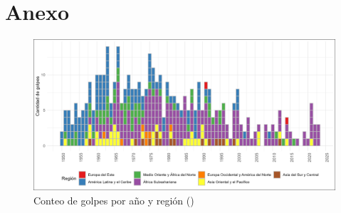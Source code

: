 \documentclass{article}
\begin{document}


\section{Anexo}

\begin{figure}[H]
  \centering  
  \includegraphics[width=1\textwidth]{4_golpes_anios.png}
  \caption{Conteo de golpes por año y región (\cite{Pow11})\label{fig:golpes_anios}}
\end{figure}

\printbibliography
\end{document}
